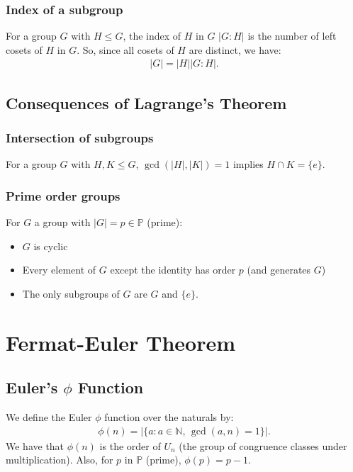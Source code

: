\documentclass[a4paper, 12pt, twoside]{article}
\DeclareMathOperator{\Gcd}{gcd}
\begin{document}
\subsubsection{Index of a subgroup}

For a group $G$ with $H \leq G$, the index of $H$ in $G$
$|G : H|$ is the number of left cosets of $H$ in $G$. So, since
all cosets of $H$ are distinct, we have:
\begin{align*}
      |G| = |H||G : H|.
\end{align*}

\subsection{Consequences of Lagrange's Theorem}

\subsubsection{Intersection of subgroups}

For a group $G$ with $H, K \leq G$, $\Gcd(|H|, |K|) = 1$ implies
$H \cap K = \{e\}$.

\subsubsection{Prime order groups}

For $G$ a group with $|G| = p \in \mathbb{P}$ (prime):

\begin{itemize}
      \item $G$ is cyclic
      \item Every element of $G$ except the identity has order $p$
            (and generates $G$)
      \item The only subgroups of $G$ are $G$ and $\{e\}$.
\end{itemize}

\section{Fermat-Euler Theorem}

\subsection{Euler's $\phi$ Function}

We define the Euler $\phi$ function over the naturals by:
\begin{align*}
      \phi(n) = \left|\{a : a \in \mathbb{N}, \, \Gcd(a, n) = 1\}\right|.
\end{align*}
We have that $\phi(n)$ is the order of $U_n$ (the group of congruence
classes under multiplication). Also, for $p$ in $\mathbb{P}$ (prime),
$\phi(p) = p - 1$.
\end{document}
